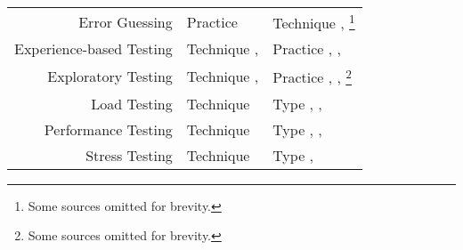 \begin{paperTable}
\begin{minipage}{\linewidth}
\begin{tabular}{|r|l|l|}
            Error Guessing           & Practice \cite[p.~33]{IEEE2013}                                     & Technique \cite[pp.~4, 34, Fig.~2]{IEEE2022}, \cite[Fig.~2, Tab.~A.2]{IEEE2021b}\footnote{Some sources omitted for brevity.}                    \\ %
            Experience-based Testing & Technique \cite[pp.~46, 50]{Firesmith2015}, \cite[Fig.~2]{IEEE2022} & Practice \cite[Fig.~2]{IEEE2022}, \cite[p.~viii]{IEEE2021b}, \cite[pp.~iii, 31, 33]{IEEE2013}                                                   \\
            Exploratory Testing      & Technique \cite[p.~50]{Firesmith2015}, \cite[p.~5\=/14]{SWEBOK2024} & Practice \cite[pp.~11, 20, 34, Fig.~2]{IEEE2022}, \cite[p.~viii]{IEEE2021b}, \cite[p.~5]{IEEE2021a}\footnote{Some sources omitted for brevity.} \\ %
            Load Testing             & Technique \cite[p.~38]{IEEE2021b}                                   & Type \cite[p.~253]{IEEE2017}, \cite[pp.~5, 20, 22]{IEEE2022}, \cite{ISTQB}                                                                      \\
            Performance Testing      & Technique \cite[p.~38]{IEEE2021b}                                   & Type \cite[pp.~7, 22, 26\==27]{IEEE2022}, \cite[p.~7]{IEEE2021b}, \cite[p.~2]{IEEE2021a}                                                        \\
            Stress Testing           & Technique \cite[p.~38]{IEEE2021b}                                   & Type \cite[p.~442]{IEEE2017}, \cite[pp.~9, 22]{IEEE2022}                                                                                        \\
            \hline
        \end{tabular}
    \end{minipage}
\end{paperTable}

